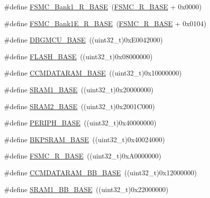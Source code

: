 \begin{DoxyCompactItemize}
\item 
\#define \hyperlink{group___peripheral__memory__map_gad196fe6f5e4041b201d14f43508c06d2}{F\-S\-M\-C\-\_\-\-Bank1\-\_\-\-R\-\_\-\-B\-A\-S\-E}~(\hyperlink{group___peripheral__memory__map_gaddf0e199dccba83272b20c9fb4d3aaed}{F\-S\-M\-C\-\_\-\-R\-\_\-\-B\-A\-S\-E} + 0x0000)
\item 
\#define \hyperlink{group___peripheral__memory__map_gaea182589c84aee30b7f735474d8774e2}{F\-S\-M\-C\-\_\-\-Bank1\-E\-\_\-\-R\-\_\-\-B\-A\-S\-E}~(\hyperlink{group___peripheral__memory__map_gaddf0e199dccba83272b20c9fb4d3aaed}{F\-S\-M\-C\-\_\-\-R\-\_\-\-B\-A\-S\-E} + 0x0104)
\item 
\#define \hyperlink{group___peripheral__memory__map_ga4adaf4fd82ccc3a538f1f27a70cdbbef}{D\-B\-G\-M\-C\-U\-\_\-\-B\-A\-S\-E}~((uint32\-\_\-t)0x\-E0042000)
\item 
\#define \hyperlink{group___peripheral__memory__map_ga23a9099a5f8fc9c6e253c0eecb2be8db}{F\-L\-A\-S\-H\-\_\-\-B\-A\-S\-E}~((uint32\-\_\-t)0x08000000)
\item 
\#define \hyperlink{group___peripheral__memory__map_gabea1f1810ebeac402164b42ab54bcdf9}{C\-C\-M\-D\-A\-T\-A\-R\-A\-M\-\_\-\-B\-A\-S\-E}~((uint32\-\_\-t)0x10000000)
\item 
\#define \hyperlink{group___peripheral__memory__map_ga7d0fbfb8894012dbbb96754b95e562cd}{S\-R\-A\-M1\-\_\-\-B\-A\-S\-E}~((uint32\-\_\-t)0x20000000)
\item 
\#define \hyperlink{group___peripheral__memory__map_gadbb42a3d0a8a90a79d2146e4014241b1}{S\-R\-A\-M2\-\_\-\-B\-A\-S\-E}~((uint32\-\_\-t)0x2001\-C000)
\item 
\#define \hyperlink{group___peripheral__memory__map_ga9171f49478fa86d932f89e78e73b88b0}{P\-E\-R\-I\-P\-H\-\_\-\-B\-A\-S\-E}~((uint32\-\_\-t)0x40000000)
\item 
\#define \hyperlink{group___peripheral__memory__map_ga52e57051bdf8909222b36e5408a48f32}{B\-K\-P\-S\-R\-A\-M\-\_\-\-B\-A\-S\-E}~((uint32\-\_\-t)0x40024000)
\item 
\#define \hyperlink{group___peripheral__memory__map_gaddf0e199dccba83272b20c9fb4d3aaed}{F\-S\-M\-C\-\_\-\-R\-\_\-\-B\-A\-S\-E}~((uint32\-\_\-t)0x\-A0000000)
\item 
\#define \hyperlink{group___peripheral__memory__map_gaf98d1f99ecd952ee59e80b345d835bb0}{C\-C\-M\-D\-A\-T\-A\-R\-A\-M\-\_\-\-B\-B\-\_\-\-B\-A\-S\-E}~((uint32\-\_\-t)0x12000000)
\item 
\#define \hyperlink{group___peripheral__memory__map_gac4c4f61082e4b168f29d9cf97dc3ca5c}{S\-R\-A\-M1\-\_\-\-B\-B\-\_\-\-B\-A\-S\-E}~((uint32\-\_\-t)0x22000000)

\end{DoxyCompactItemize}
